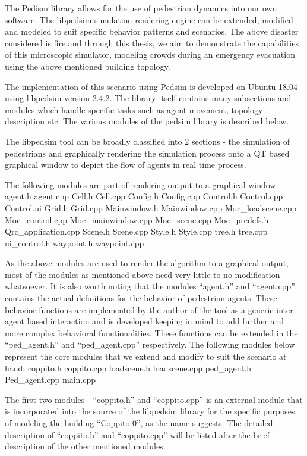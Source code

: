 %  

The Pedism library allows for the use of pedestrian dynamics into our own software. The libpedsim simulation rendering engine can be extended, modified and modeled to suit specific behavior patterns and scenarios. The above disaster considered is fire and through this thesis, we aim to demonstrate the capabilities of this microscopic simulator, modeling crowds during an emergency evacuation using the above mentioned building topology. 

The implementation of this scenario using Pedsim is developed on Ubuntu 18.04 using libpedsim version 2.4.2.
The library itself contains many subsections and modules which handle specific tasks such as agent movement, topology description etc. The various modules of the pedsim library is described below.

The libpedsim tool can be broadly classified into 2 sections - the simulation of pedestrians and graphically rendering the simulation process onto a QT based graphical window to depict the flow of agents in real time process.

The following modules are part of rendering output to a graphical window
agent.h
agent.cpp
Cell.h
Cell.cpp
Config.h
Config.cpp
Control.h
Control.cpp
Control.ui
Grid.h
Grid.cpp
Mainwindow.h
Mainwindow.cpp
Moc_loadscene.cpp
Moc_control.cpp
Moc_mainwindow.cpp
Moc_scene.cpp
Moc_predefs.h
Qrc_application.cpp
Scene.h
Scene.cpp
Style.h
Style.cpp
tree.h
tree.cpp
ui_control.h
waypoint.h
waypoint.cpp

As the above modules are used to render the algorithm to a graphical output, most of the modules as mentioned above need very little to no modification whatsoever. It is also worth noting that the modules “agent.h” and “agent.cpp” contains the actual definitions for the behavior of pedestrian agents. These behavior functions are implemented by the author of the tool as a generic inter-agent based interaction and is developed keeping in mind to add further and more complex behavioral functionalities. These functions can be extended in the “ped_agent.h” and “ped_agent.cpp” respectively. 
The following modules below represent the core modules that we extend and modify to suit the scenario at hand:
coppito.h
coppito.cpp
loadscene.h
loadscene.cpp
ped_agent.h
Ped_agent.cpp
main.cpp

 The first two modules - “coppito.h” and “coppito.cpp” is an external module that is incorporated into the source of the libpedsim library for the specific purposes of modeling the building “Coppito 0”, as the name suggests. The detailed description of “coppito.h” and “coppito.cpp” will be listed after the brief description of the other mentioned modules. 

